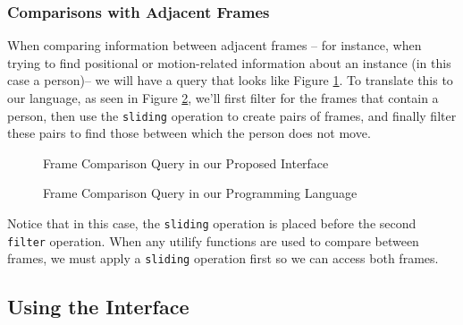 \subsubsection{Comparisons with Adjacent Frames}
When comparing information between adjacent frames -- for instance, when trying to find positional or motion-related information about an instance (in this case a person)-- we will have a query that looks like Figure \ref{fig:Comp1}. 
To translate this to our language, as seen in Figure \ref{fig:Comp2}, we'll first filter for the frames that contain a person, then use the \texttt{sliding} operation to create pairs of frames, and finally filter these pairs to find those between which the person does not move. 

\begin{figure}[H]
    \caption{Frame Comparison Query in our Proposed Interface}
    \label{fig:Comp1}
\end{figure}

\begin{figure}[H]
    \caption{Frame Comparison Query in our Programming Language}
    \label{fig:Comp2}
\end{figure}

Notice that in this case, the \texttt{sliding} operation is placed before the second \texttt{filter} operation. 
When any utilify functions are used to compare between frames, we must apply a \texttt{sliding} operation first so we can access both frames.

\subsection{Using the Interface}

